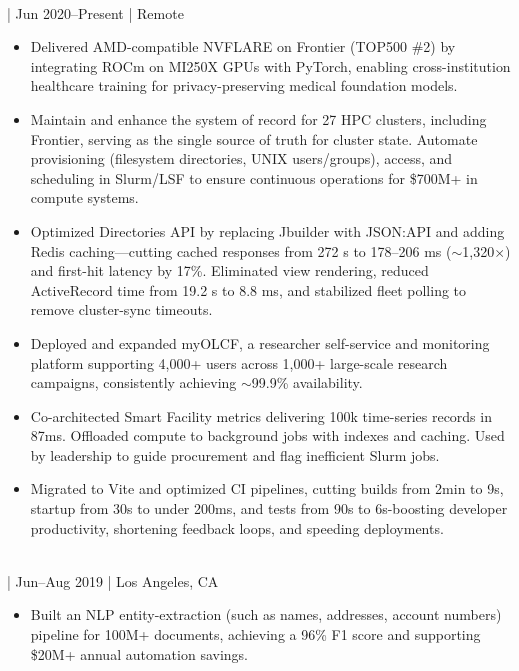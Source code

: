 \documentclass[11pt,a4paper]{article}
\newcommand{\regbullet}[1]{
    \vspace{-2pt}%
    \item {\fontsize{10}{12}\selectfont #1}
}
\begin{document}
\\
  |  {\fontsize{10}{12}\selectfont Jun 2020--Present}  |  {\fontsize{10}{12}\selectfont Remote}
\begin{itemize}[leftmargin=18pt,itemsep=1pt,topsep=0pt]
\regbullet{Delivered AMD-compatible NVFLARE on Frontier (TOP500 \#2) by integrating ROCm on MI250X GPUs with PyTorch, enabling cross-institution healthcare training for privacy-preserving medical foundation models.}

\regbullet{Maintain and enhance the system of record for 27 HPC clusters, including Frontier, serving as the single source of truth for cluster state. Automate provisioning (filesystem directories, UNIX users/groups), access, and scheduling in Slurm/LSF to ensure continuous operations for \$700M+ in compute systems.}

\regbullet{Optimized Directories API by replacing Jbuilder with JSON:API and adding Redis caching—cutting cached responses from 272 s to 178--206 ms ($\sim$1,320$\times$) and first-hit latency by 17\%. Eliminated view rendering, reduced ActiveRecord time from 19.2 s to 8.8 ms, and stabilized fleet polling to remove cluster-sync timeouts.}

\regbullet{Deployed and expanded myOLCF, a researcher self-service and monitoring platform supporting 4,000+ users across 1,000+ large-scale research campaigns, consistently achieving $\sim$99.9\% availability.}

\regbullet{Co-architected Smart Facility metrics delivering 100k time-series records in 87ms. Offloaded compute to background jobs with indexes and caching. Used by leadership to guide procurement and flag inefficient Slurm jobs.}

\regbullet{Migrated to Vite and optimized CI pipelines, cutting builds from 2min to 9s, startup from 30s to under 200ms, and tests from 90s to 6s-boosting developer productivity, shortening feedback loops, and speeding deployments.}

\end{itemize}

\vspace{2pt}
\\
  |  {\fontsize{10}{12}\selectfont Jun--Aug 2019}  |  {\fontsize{10}{12}\selectfont Los Angeles, CA}
\begin{itemize}[leftmargin=18pt,itemsep=1pt,topsep=0pt]
\regbullet{Built an NLP entity-extraction (such as names, addresses, account numbers) pipeline for 100M+ documents, achieving a 96\% F1 score and supporting \$20M+ annual automation savings.}
\end{itemize}
\end{document}
